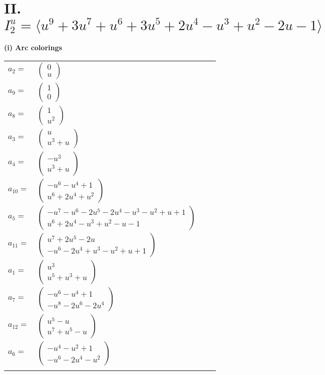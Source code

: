 \documentclass[1p]{elsarticle_modified}
\theoremstyle{definition}
\begin{document}
\centering \section*{II. $I^u_{2}= \langle u^9+3 u^7+u^6+3 u^5+2 u^4- u^3+u^2-2 u-1 \rangle$}
\flushleft \textbf{(i) Arc colorings}\\
\begin{tabular}{m{7pt} m{180pt} m{7pt} m{180pt} }
\flushright $a_{2}=$&$\begin{pmatrix}0\\u\end{pmatrix}$ \\
\flushright $a_{9}=$&$\begin{pmatrix}1\\0\end{pmatrix}$ \\
\flushright $a_{8}=$&$\begin{pmatrix}1\\u^2\end{pmatrix}$ \\
\flushright $a_{3}=$&$\begin{pmatrix}u\\u^3+u\end{pmatrix}$ \\
\flushright $a_{4}=$&$\begin{pmatrix}- u^3\\u^3+u\end{pmatrix}$ \\
\flushright $a_{10}=$&$\begin{pmatrix}- u^6- u^4+1\\u^6+2 u^4+u^2\end{pmatrix}$ \\
\flushright $a_{5}=$&$\begin{pmatrix}- u^7- u^6-2 u^5-2 u^4- u^3- u^2+u+1\\u^6+2 u^4- u^3+u^2- u-1\end{pmatrix}$ \\
\flushright $a_{11}=$&$\begin{pmatrix}u^7+2 u^5-2 u\\- u^6-2 u^4+u^3- u^2+u+1\end{pmatrix}$ \\
\flushright $a_{1}=$&$\begin{pmatrix}u^3\\u^5+u^3+u\end{pmatrix}$ \\
\flushright $a_{7}=$&$\begin{pmatrix}- u^6- u^4+1\\- u^8-2 u^6-2 u^4\end{pmatrix}$ \\
\flushright $a_{12}=$&$\begin{pmatrix}u^5- u\\u^7+u^5- u\end{pmatrix}$ \\
\flushright $a_{6}=$&$\begin{pmatrix}- u^4- u^2+1\\- u^6-2 u^4- u^2\end{pmatrix}$\\&\end{tabular}
\end{document}
